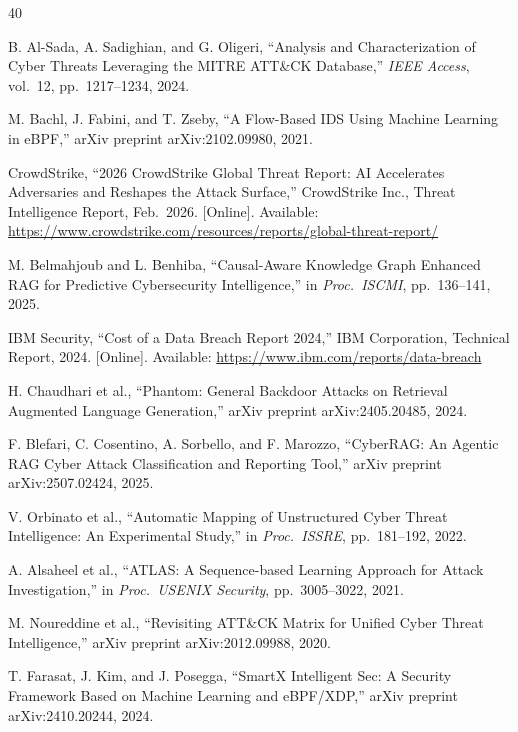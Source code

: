 \begin{thebibliography}{40}

 B. Al-Sada, A. Sadighian, and G. Oligeri, ``Analysis and Characterization of Cyber Threats Leveraging the MITRE ATT\&CK Database,'' \emph{IEEE Access}, vol.~12, pp.~1217--1234, 2024.

 M. Bachl, J. Fabini, and T. Zseby, ``A Flow-Based IDS Using Machine Learning in eBPF,'' arXiv preprint arXiv:2102.09980, 2021.

 CrowdStrike, ``2026 CrowdStrike Global Threat Report: AI Accelerates Adversaries and Reshapes the Attack Surface,'' CrowdStrike Inc., Threat Intelligence Report, Feb.\ 2026. [Online]. Available: \url{https://www.crowdstrike.com/resources/reports/global-threat-report/}

 M. Belmahjoub and L. Benhiba, ``Causal-Aware Knowledge Graph Enhanced RAG for Predictive Cybersecurity Intelligence,'' in \emph{Proc.\ ISCMI}, pp.~136--141, 2025.

 IBM Security, ``Cost of a Data Breach Report 2024,'' IBM Corporation, Technical Report, 2024. [Online]. Available: \url{https://www.ibm.com/reports/data-breach}

 H. Chaudhari et al., ``Phantom: General Backdoor Attacks on Retrieval Augmented Language Generation,'' arXiv preprint arXiv:2405.20485, 2024.

 F. Blefari, C. Cosentino, A. Sorbello, and F. Marozzo, ``CyberRAG: An Agentic RAG Cyber Attack Classification and Reporting Tool,'' arXiv preprint arXiv:2507.02424, 2025.

 V. Orbinato et al., ``Automatic Mapping of Unstructured Cyber Threat Intelligence: An Experimental Study,'' in \emph{Proc.\ ISSRE}, pp.~181--192, 2022.

 A. Alsaheel et al., ``ATLAS: A Sequence-based Learning Approach for Attack Investigation,'' in \emph{Proc.\ USENIX Security}, pp.~3005--3022, 2021.

 M. Noureddine et al., ``Revisiting ATT\&CK Matrix for Unified Cyber Threat Intelligence,'' arXiv preprint arXiv:2012.09988, 2020.

 T. Farasat, J. Kim, and J. Posegga, ``SmartX Intelligent Sec: A Security Framework Based on Machine Learning and eBPF/XDP,'' arXiv preprint arXiv:2410.20244, 2024.


\end{thebibliography}
